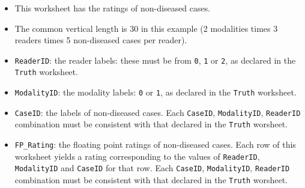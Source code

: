 \documentclass[]{book}
\newenvironment{Shaded}{\begin{snugshade}}{\end{snugshade}}
\newcommand{\CommentTok}[1]{\textcolor[rgb]{0.56,0.35,0.01}{\textit{#1}}}
\newcommand{\DecValTok}[1]{\textcolor[rgb]{0.00,0.00,0.81}{#1}}
\newcommand{\NormalTok}[1]{#1}
\newcommand{\OperatorTok}[1]{\textcolor[rgb]{0.81,0.36,0.00}{\textbf{#1}}}
\providecommand{\tightlist}{%
  \setlength{\itemsep}{0pt}\setlength{\parskip}{0pt}}
\begin{document}
\begin{itemize}
\tightlist
\item
  This worksheet has the ratings of non-diseased cases.
\item
  The common vertical length is 30 in this example (2 modalities times 3 readers times 5 non-diseased cases per reader).
\item
  \texttt{ReaderID}: the reader labels: these must be from \texttt{0}, \texttt{1} or \texttt{2}, as declared in the \texttt{Truth} worksheet.
\item
  \texttt{ModalityID}: the modality labels: \texttt{0} or \texttt{1}, as declared in the \texttt{Truth} worksheet.
\item
  \texttt{CaseID}: the labels of non-diseased cases. Each \texttt{CaseID}, \texttt{ModalityID}, \texttt{ReaderID} combination must be consistent with that declared in the \texttt{Truth} worsheet.\\
\item
  \texttt{FP\_Rating}: the floating point ratings of non-diseased cases. Each row of this worksheet yields a rating corresponding to the values of \texttt{ReaderID}, \texttt{ModalityID} and \texttt{CaseID} for that row. Each \texttt{CaseID}, \texttt{ModalityID}, \texttt{ReaderID} combination must be consistent with that declared in the \texttt{Truth} worsheet.
\end{itemize}

\begin{Shaded}
\end{Shaded}
\end{document}
